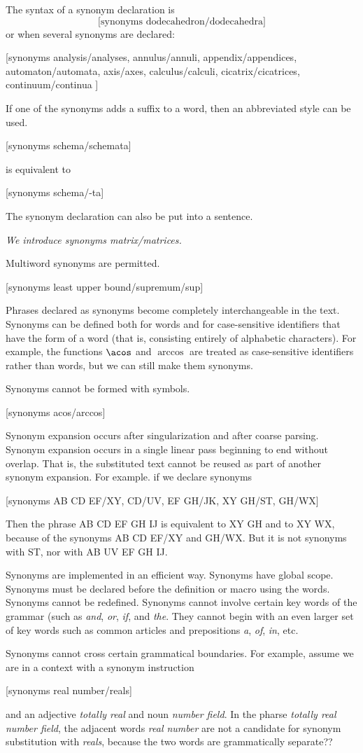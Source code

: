 \documentclass[12pt]{article}
\numberwithin{definition}{section}
\begin{document}
The syntax of a synonym declaration is
\[
\text{[synonyms dodecahedron/dodecahedra]}
\]
or when several synonyms are declared:

[synonyms analysis/analyses,
annulus/annuli,
appendix/appendices,
automaton/automata,
axis/axes,
calculus/calculi,
cicatrix/cicatrices,
continuum/continua
]
\]

If one of the synonyms adds a suffix to a word,
then an abbreviated style can be used.

[synonyms schema/schemata]

is equivalent to

[synonyms schema/-ta]

The synonym declaration can also be put into a sentence.

{\it We introduce synonyms matrix/matrices.}

Multiword synonyms are permitted.

[synonyms least upper bound/supremum/sup]

Phrases declared as synonyms become completely interchangeable in the
text.  Synonyms can be defined both for words and for case-sensitive
identifiers that have the form of a word (that is, consisting entirely
of alphabetic characters). For example, the functions $\acos$ and
$\arccos$ are treated as case-sensitive identifiers rather than words,
but we can still make them synonyms.

Synonyms cannot be formed with symbols.

[synonyms acos/arccos]

Synonym expansion occurs after singularization and after coarse parsing.
Synonym expansion occurs in a single linear pass beginning to end 
without overlap.  That is, the substituted text cannot be reused
as part of another synonym expansion.  For example.
if we declare synonyms

[synonyms AB CD EF/XY, CD/UV, EF GH/JK, XY GH/ST, GH/WX]

Then the phrase AB CD EF GH IJ is equivalent to XY GH and to XY WX,
because of the synonyms
AB CD EF/XY and GH/WX.  But it is not synonyms with
ST, nor with AB UV EF GH IJ.



Synonyms are implemented in an efficient way.  Synonyms have global scope.
Synonyms must be declared before the definition or macro using the words.
Synonyms cannot be redefined.  Synonyms cannot involve certain key words
of the grammar (such as {\it and}, {\it or}, {\it if}, and {\it the}.
They cannot begin with an even larger set of key words such as 
common articles and prepositions {\it a}, {\it of},
{\it in}, etc.

Synonyms cannot cross certain grammatical boundaries.
For example, assume we are in a context with a synonym instruction

[synonyms real number/reals]

and an adjective {\it totally real} and noun {\it number field}.
In the pharse {\it totally real number field}, the adjacent words {\it real number}
are not a candidate for synonym substitution with {\it reals}, because 
the two words are grammatically separate??
\end{document}
